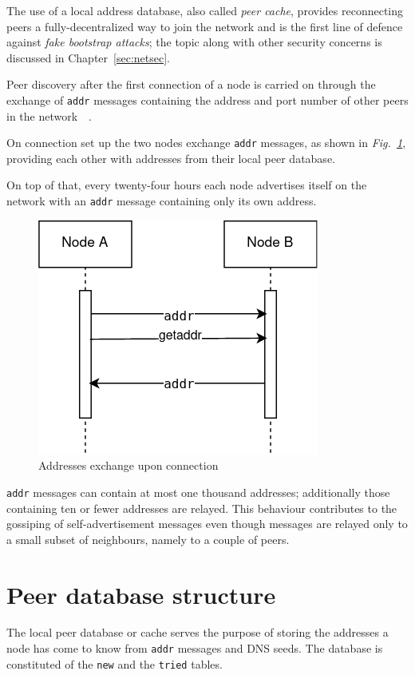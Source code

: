 The use of a local address database, also called \emph{peer cache}, provides reconnecting peers a fully-decentralized way to join the network and is the first line of defence against \emph{fake bootstrap attacks}; the topic along with other security concerns is discussed in Chapter~\ref{sec:netsec}.\par

Peer discovery after the first connection of a node is carried on through the exchange of \texttt{addr} messages containing the address and port number of other peers in the network~\cite{protocoldoc}~\cite{devguidep2p}.

On connection set up the two nodes exchange \texttt{addr} messages, as shown in \emph{Fig.~\ref{fig:addr}}, providing each other with addresses from their local peer database.

On top of that, every twenty-four hours each node advertises itself on the network with an \texttt{addr} message containing only its own address.

\begin{figure}[h]
	\includegraphics[width=.45\textwidth]{pict/BTCaddr.png}
	\centering
	\caption{Addresses exchange upon connection}
	\label{fig:addr}
\end{figure}

\texttt{addr} messages can contain at most one thousand addresses; additionally those containing ten or fewer addresses are relayed. This behaviour contributes to the gossiping of self-advertisement messages even though messages are relayed only to a small subset of neighbours, namely to a couple of peers.

\section{Peer database structure}\label{sec:cachestruct}
The local peer database or cache serves the purpose of storing the addresses a node has come to know from \texttt{addr} messages and DNS seeds. The database is constituted of the \texttt{new} and the \texttt{tried} tables.

